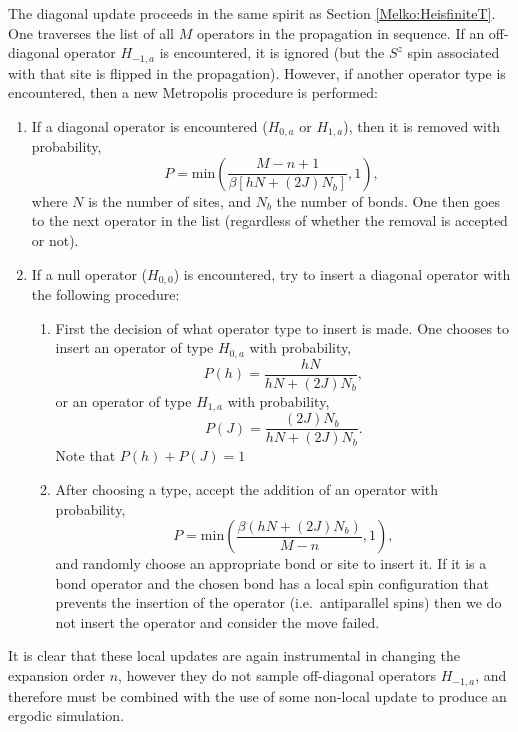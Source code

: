 \documentclass[vecphys]{svmult}
\begin{document}
The diagonal update proceeds in the same spirit as Section \ref{Melko:HeisfiniteT}.  One traverses the list of all $M$ operators in the propagation in sequence. If an off-diagonal operator $H_{-1,a}$ is encountered, it is ignored (but the $S^z$ spin associated with that site is flipped in the propagation).  However, if another operator type is encountered, then a new Metropolis procedure is performed:
\begin{enumerate}
\item If a diagonal operator is encountered ($H_{0,a}$ or $H_{1,a}$), then it is removed with probability,
\begin{equation}
P = \mathrm{min}\left( \frac{M-n+1}{\beta[hN + (2J)N_b]},1\right),
\end{equation}
where $N$ is the number of sites, and $N_b$ the number of bonds.  
One then goes to the next operator in the list (regardless of whether the removal is accepted or not).
\item If a null operator ($H_{0,0}$) is encountered,  try to insert a diagonal operator with the following procedure:
\begin{enumerate}
\item First the decision of what operator type to insert is made.  One chooses to insert an operator of type $H_{0,a}$ with probability,
\begin{equation}
P(h) = \frac{h N}{hN + (2J)N_b},
\end{equation}
or an operator of type $H_{1,a}$ with probability,
\begin{equation}
P(J) = \frac{(2J)N_b}{hN + (2J)N_b} .
\end{equation}
Note that $P(h) + P(J) = 1$
\item After choosing a type, accept the addition of an operator with probability,
\begin{equation}
P = \mathrm{min}\left(\frac{\beta(hN + (2J)N_b)}{M-n},1\right),
\end{equation}
and randomly choose an appropriate bond or site to insert it.
If it is a bond operator and the chosen bond has a local spin configuration that prevents the insertion of the operator (i.e.~antiparallel spins) then we do not insert the operator and consider the move failed.
\end{enumerate}
\end{enumerate}
It is clear that these local updates are again instrumental in changing the expansion order $n$, however they do not sample off-diagonal operators $H_{-1,a}$, and therefore must be combined with the use of some non-local update to produce an ergodic simulation.
\end{document}
